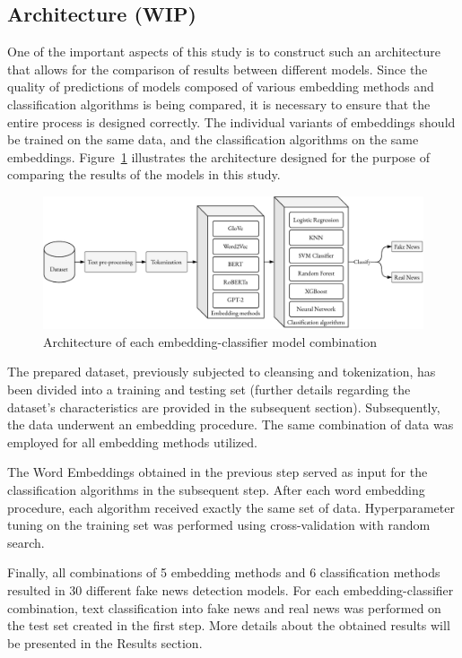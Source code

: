 \subsection{Architecture (WIP)}
One of the important aspects of this study is to construct such an architecture that allows for the comparison of results between different models. Since the quality of predictions of models composed of various embedding methods and classification algorithms is being compared, it is necessary to ensure that the entire process is designed correctly. The individual variants of embeddings should be trained on the same data, and the classification algorithms on the same embeddings. Figure~\ref{methodology-schema_extended} illustrates the architecture designed for the purpose of comparing the results of the models in this study.

\begin{figure}
\centering
\includegraphics[width=0.8\linewidth]{methodology-schema_gpt2_extended.pdf}
\caption{Architecture of each embedding-classifier model combination}
\label{methodology-schema_extended}
\end{figure}

The prepared dataset, previously subjected to cleansing and tokenization, has been divided into a training and testing set (further details regarding the dataset's characteristics are provided in the subsequent section). Subsequently, the data underwent an embedding procedure. The same combination of data was employed for all embedding methods utilized.

The Word Embeddings obtained in the previous step served as input for the classification algorithms in the subsequent step. After each word embedding procedure, each algorithm received exactly the same set of data. Hyperparameter tuning on the training set was performed using cross-validation with random search.

Finally, all combinations of 5 embedding methods and 6 classification methods resulted in 30 different fake news detection models. For each embedding-classifier combination, text classification into fake news and real news was performed on the test set created in the first step. More details about the obtained results will be presented in the Results section.


